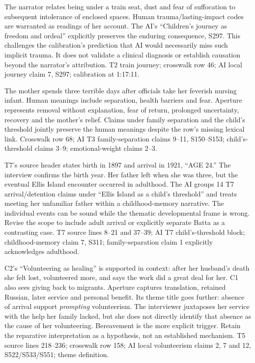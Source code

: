 {The narrator relates being under a train seat, dust and fear of suffocation to subsequent intolerance of enclosed spaces. Human trauma/lasting-impact codes are warranted as readings of her account.}
{The AI's ``Children's journey as freedom and ordeal'' explicitly preserves the enduring consequence, S297. This challenges the calibration's prediction that AI would necessarily miss such implicit trauma. It does not validate a clinical diagnosis or establish causation beyond the narrator's attribution.}
{T2 train journey; crosswalk row 46; AI local journey claim 7, S297; calibration at 1:17:11.}

{The mother spends three terrible days after officials take her feverish nursing infant. Human meanings include separation, health barriers and fear.}
{Aperture represents removal without explanation, fear of return, prolonged uncertainty, recovery and the mother's relief. Claims under family separation and the child's threshold jointly preserve the human meanings despite the row's missing lexical link.}
{Crosswalk row 68; AI T3 family-separation claims 9--11, S150--S153; child's-threshold claims 3--9; emotional-weight claims 2--3.}

{T7's source header states birth in 1897 and arrival in 1921, ``AGE 24.'' The interview confirms the birth year. Her father left when she was three, but the eventual Ellis Island encounter occurred in adulthood.}
{The AI groups 14 T7 arrival/detention claims under ``Ellis Island as a child's threshold'' and treats meeting her unfamiliar father within a childhood-memory narrative. The individual events can be sound while the thematic developmental frame is wrong. Revise the scope to include adult arrival or explicitly separate Batta as a contrasting case.}
{T7 source lines 8--21 and 37--39; AI T7 child's-threshold block; childhood-memory claim 7, S311; family-separation claim 1 explicitly acknowledges adulthood.}

{C2's ``Volunteering as healing'' is supported in context: after her husband's death she felt lost, volunteered more, and says the work did a great deal for her. C1 also sees giving back to migrants.}
{Aperture captures translation, retained Russian, later service and personal benefit. Its theme title goes further: absence of arrival support \emph{prompting} volunteerism. The interviewer juxtaposes her service with the help her family lacked, but she does not directly identify that absence as the cause of her volunteering. Bereavement is the more explicit trigger. Retain the reparative interpretation as a hypothesis, not an established mechanism.}
{T5 source lines 218--236; crosswalk row 158; AI local volunteerism claims 2, 7 and 12, S522/S533/S551; theme definition.}

